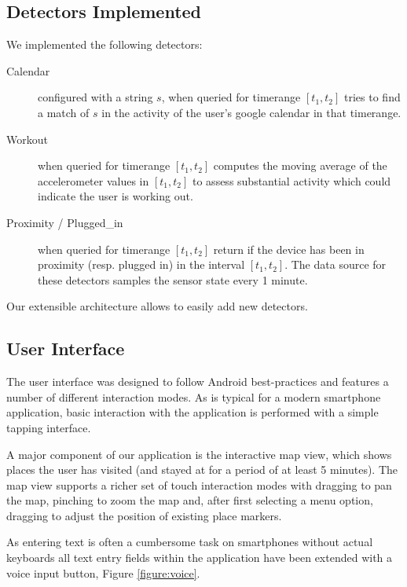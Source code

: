 \documentclass{acm_proc_article-sp}
\begin{document}
\subsection{Detectors Implemented}

We implemented the following detectors:
\begin{description}
\item[Calendar] configured with a string $s$, when queried for timerange $[t_1,t_2]$ tries to find a match of $s$ in the activity of the user's google calendar in that timerange.
\item[Workout] when queried for timerange $[t_1,t_2]$ computes the moving average of the accelerometer values in $[t_1,t_2]$ to assess substantial activity which could indicate the user is working out. 
\item[Proximity / Plugged\_in] when queried for timerange $[t_1,t_2]$ return if the device has been in proximity (resp. plugged in) in the interval $[t_1,t_2]$. The data source for these detectors samples the sensor state every 1 minute.
\end{description}

Our extensible architecture allows to easily add new detectors.


\subsection {User Interface}
The user interface was designed to follow Android best-practices and features a number of different interaction modes. As is typical for a modern smartphone application, basic interaction with the application is performed with a simple tapping interface. 

A major component of our application is the interactive map view, which shows places the user has visited (and stayed at for a period of at least 5 minutes). The map view supports a richer set of touch interaction modes with dragging to pan the map, pinching to zoom the map and, after first selecting a menu option, dragging to adjust the position of existing place markers.

As entering text is often a cumbersome task on smartphones without actual keyboards all text entry fields within the application have been extended with a voice input button, Figure \ref{figure:voice}.
\end{document}
